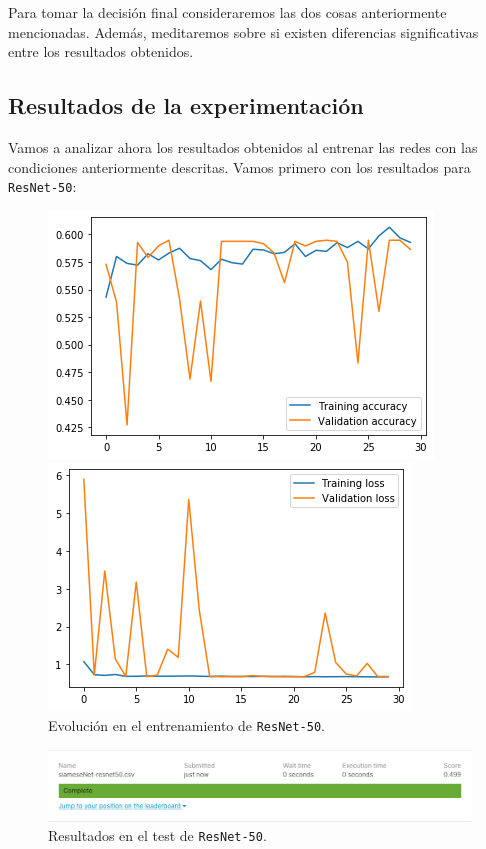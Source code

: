 \documentclass[11pt,a4paper]{article}
\begin{document}
Para tomar la decisión final consideraremos las dos cosas anteriormente mencionadas. Además, meditaremos sobre
si existen diferencias significativas entre los resultados obtenidos.
\subsection{Resultados de la experimentación}

Vamos a analizar ahora los resultados obtenidos al entrenar las redes con las condiciones anteriormente
descritas. Vamos primero con los resultados para \texttt{ResNet-50}:

\begin{figure}[H]
\centering
\begin{minipage}{0.5\textwidth}
  \centering
  \includegraphics[scale=0.5]{img/accuracy-resnet50.png}
\end{minipage}%
\begin{minipage}{0.5\textwidth}
  \centering
  \includegraphics[scale=0.5]{img/loss-resnet50.png}
\end{minipage}
\caption{Evolución en el entrenamiento de \texttt{ResNet-50}.}
\label{fig:graph-resnet50}
\end{figure}

\begin{figure}[H]
    \centering
    \includegraphics[scale=0.55]{img/siameseNet-resnet50.png}
    \caption{Resultados en el test de \texttt{ResNet-50}.}
    \label{fig:test-resnet50}
\end{figure}
\end{document}
